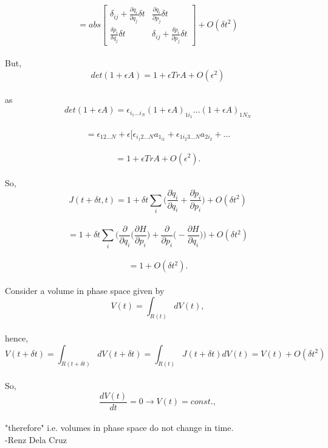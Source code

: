 \documentclass[12pt, letterpaper, oneside, article]{memoir}
\begin{document}
$$=abs\begin{bmatrix}
\delta_{ij}+\frac{\partial \dot{q}_i}{\partial q_j}\delta t&\frac{\partial \dot{q}_i}{\partial p_j}\delta t\\
\frac{\delta\dot{p}_i}{\delta q_j}\delta t&\delta_{ij}+\frac{\delta \dot{p}_i}{\partial p_j}\delta t
\end{bmatrix}+O(\delta t^2)
$$\\
But,\\
$$det(1+\epsilon A)=1+\epsilon TrA+O(\epsilon^2)$$\\
as\\
$$det(1+\epsilon A)=\epsilon_{i_1...i_N}(1+\epsilon A)_{1i_1}...(1+\epsilon A)_{1N_N}$$\\
$$=\epsilon_{12...N}+\epsilon [\epsilon_{{i_1}2...N}a_{{1_{i1}}}+\epsilon_{1i_{2}3...N}a_{2i_2}+...$$\\
$$=1+\epsilon TrA+O(\epsilon ^2).$$\\
So,\\
$$J(t+\delta t,t)=1+\delta t\sum_{i}\Big( \frac{\partial \dot{q}_i}{\partial q_i}+\frac{\partial \dot p_i}{\partial p_i}\Big) +O(\delta t^2)$$\\
$$=1+\delta t \sum_{i} \Big(\frac{\partial}{\partial q_i}\Big( \frac{\partial H}{\partial p_i}\Big)+\frac{\partial}{\partial p_i}\Big(-\frac{\partial H}{\partial q_i}\Big) \Big)+O(\delta t^2)$$\\
$$=1+O(\delta t^2).$$\\
Consider a volume in phase space given by\\
$$V(t)=\int_{R(t)}dV(t),$$\\
hence,\\
$$V(t+\delta t)=\int_{R(t+\delta t)} dV(t+\delta t)=\int_{R(t)} J(t+\delta t)dV(t)=V(t)+O(\delta t^2)$$\\
So,
$$\frac{dV(t)}{dt}=0\rightarrow V(t) = const.,$$\\
"therefore" i.e. volumes in phase space do not change in time.
 \\
 -Renz Dela Cruz
\end{document}
